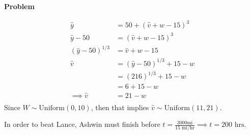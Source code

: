 \documentclass[12pt]{article}
\newenvironment{Ex}{\textbf{Problem}\vspace{.75em}\\}{}
\begin{document}
\begin{enumerate}
\begin{Ex}
\begin{solution}
\begin{enumerate}
        \begin{equation}
          \label{eq:4d-ashwins-velocity}
          \begin{aligned}
            \hat{y} &= 50 + (\hat{v}+w-15)^3 \\
            \hat{y} - 50 &= (\hat{v}+w-15)^3 \\
            (\hat{y} - 50)^{1/3} &= \hat{v}+w-15 \\
            \hat{v} &= (\hat{y} - 50)^{1/3} + 15 - w \\
            &= (216)^{1/3} + 15 - w \\
            &= 6+15-w \\
            \implies \hat{v} &= 21-w \\
          \end{aligned}
        \end{equation}
        Since $W\sim\text{Uniform}(0,10)$, then that implies
        $\hat{v}\sim\text{Uniform}(11,21)$.

        In order to beat Lance, Ashwin must finish before
        $t=\frac{3000\text{mi}}{15\text{ mi/hr}}
        \implies t=200\text{ hrs}$.


\end{enumerate}
\end{solution}
\end{Ex}
\end{enumerate}
\end{document}
